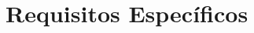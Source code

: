 \documentclass[
10pt, %
a4paper, %
oneside, %
headinclude,footinclude, %
BCOR5mm, %
]{scrartcl}
\begin{document}













\section{Requisitos Específicos}\label{reqs}
\end{document}
